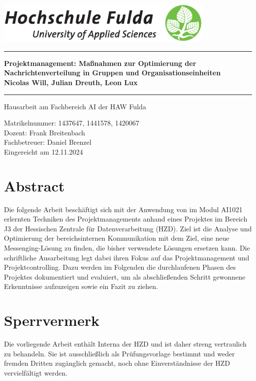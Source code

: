 \documentclass[12pt,oneside]{article}
\newcommand{\HSFTitle}[8]{

  \thispagestyle{empty}
\begin{center}
    \includegraphics[width=0.8\textwidth]{logo.eps} \\
    \vspace*{\stretch{1}}
    \end{center}

  {\parindent0cm
  \rule{\linewidth}{.7ex}}
  \begin{center}
    \vspace*{\stretch{1}}
    \sffamily\bfseries\Huge
    #1\\
    \vspace*{\stretch{1}}
    \sffamily\bfseries\large
    #3
    \vspace*{\stretch{1}}
  \end{center}
  \rule{\linewidth}{.7ex}

  \vspace*{\stretch{2}}
  \begin{center}
    \Large #2 am #5 der HAW Fulda \\
    \vspace*{\stretch{1}}

    \large Matrikelnummer:  #4 \\[1mm]
    \large Dozent:  #7 \\[1mm]
    \large Fachbetreuer:  #8 \\[1mm]

    \vspace*{\stretch{1}}
    \large Eingereicht am #6
  \end{center}
}
\begin{document}
\makeatletter
  \HSFTitle
      {Projektmanagement: Maßnahmen zur Optimierung der Nachrichtenverteilung in Gruppen und Organisationseinheiten }        %
      {Hausarbeit} %
      {Nicolas Will, Julian Dreuth, Leon Lux}          %
      {1437647, 1441578, 1420067}
      {Fachbereich AI}  %
      {12.11.2024}        %
      {Frank Breitenbach}     %
      {Daniel Brenzel}    %
  \clearpage

\lhead{}
    \setcounter{page}{1}

\clearpage
%
\section*{Abstract}

Die folgende Arbeit beschäftigt sich mit der Anwendung von im Modul AI1021 erlernten Techniken des Projektmanagements anhand eines Projektes im 
Bereich J3 der Hessischen Zentrale für Datenverarbeitung (HZD). Ziel ist die Analyse und Optimierung der bereichsinternen Kommunikation mit dem Ziel, 
eine neue Messenging-Lösung zu finden, die bisher verwendete Lösungen ersetzen kann. Die schriftliche Ausarbeitung legt dabei ihren Fokus auf 
das Projektmanagement und Projektcontrolling. Dazu werden im Folgenden die durchlaufenen Phasen des Projektes dokumentiert und evaluiert, um als 
abschließenden Schritt gewonnene Erkenntnisse aufzuzeigen sowie ein Fazit zu ziehen.

\section*{Sperrvermerk}
Die vorliegende Arbeit enthält Interna der HZD und ist daher streng vertraulich zu behandeln. Sie ist ausschließlich als Prüfungsvorlage bestimmt und weder
fremden Dritten zugänglich gemacht, noch ohne Einverständnisse der HZD vervielfältigt werden.


\clearpage
\tableofcontents
\clearpage

\listoffigures

\listoftables
\clearpage


\cleardoublepage
{}
    \setcounter{page}{1}
\lhead{\nouppercase{\leftmark}}
\end{document}
